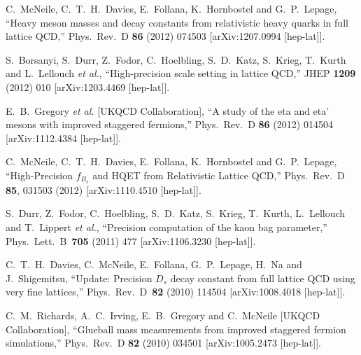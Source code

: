 \begin{thebibliography}{130}
  C.~McNeile, C.~T.~H.~Davies, E.~Follana, K.~Hornbostel and
  G.~P.~Lepage,
  ``Heavy meson masses and decay constants from relativistic heavy
  quarks in full lattice QCD,''
  Phys.\ Rev.\ D {\bf 86} (2012) 074503
  [arXiv:1207.0994 [hep-lat]].

 S.~Borsanyi, S.~Durr, Z.~Fodor, C.~Hoelbling, S.~D.~Katz, S.~Krieg,
 T.~Kurth and L.~Lellouch {\it et al.},
  ``High-precision scale setting in lattice QCD,''
  JHEP {\bf 1209} (2012) 010
  [arXiv:1203.4469 [hep-lat]].


  E.~B.~Gregory {\it et al.}  [UKQCD Collaboration],
  ``A study of the eta and eta' mesons with improved staggered
  fermions,''
  Phys.\ Rev.\ D {\bf 86} (2012) 014504
  [arXiv:1112.4384 [hep-lat]].

  C.~McNeile, C.~T.~H.~Davies, E.~Follana, K.~Hornbostel and
  G.~P.~Lepage,
  ``High-Precision $f_{B_s}$ and HQET from Relativistic Lattice
  QCD,''
  Phys.\ Rev.\ D {\bf 85}, 031503 (2012)
  [arXiv:1110.4510 [hep-lat]].




  S.~Durr, Z.~Fodor, C.~Hoelbling, S.~D.~Katz, S.~Krieg, T.~Kurth,
  L.~Lellouch and T.~Lippert {\it et al.},
  ``Precision computation of the kaon bag parameter,''
  Phys.\ Lett.\ B\ {\bf 705} (2011) 477
  [arXiv:1106.3230 [hep-lat]].

  C.~T.~H.~Davies, C.~McNeile, E.~Follana, G.~P.~Lepage, H.~Na and
  J.~Shigemitsu,
  ``Update: Precision $D_s$ decay constant from full lattice QCD
  using very fine lattices,''
  Phys.\ Rev.\ D\ {\bf 82} (2010) 114504
  [arXiv:1008.4018 [hep-lat]].

  C.~M.~Richards, A.~C.~Irving, E.~B.~Gregory and C.~McNeile  [UKQCD
                  Collaboration],
  ``Glueball mass measurements from improved staggered fermion
  simulations,''
  Phys.\ Rev.\  D {\bf 82} (2010) 034501
  [arXiv:1005.2473 [hep-lat]].



\end{thebibliography}
